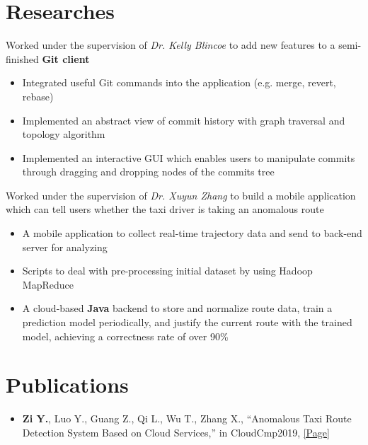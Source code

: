 \documentclass{resume}
\begin{document}
\section{Researches}
\begin{flushleft}
Worked under the supervision of \textit{Dr. Kelly Blincoe} to add new features to a semi-finished \textbf{Git client}
\begin{itemize}
    \item Integrated useful Git commands into the application (e.g. merge, revert, rebase)
    \item Implemented an abstract view of commit history with graph traversal and topology algorithm
    \item Implemented an interactive GUI which enables users to manipulate commits through dragging and \linebreak dropping nodes of the commits tree
\end{itemize}
Worked under the supervision of \textit{Dr. Xuyun Zhang} to build a mobile application which can tell users whether \linebreak the taxi driver is taking an anomalous route
\begin{itemize}
    \item A mobile application to collect real-time trajectory data and send to back-end server for analyzing
    \item Scripts to deal with pre-processing initial dataset by using Hadoop MapReduce
    \item A cloud-based \textbf{Java} backend to store and normalize route data, train a prediction model periodically, \linebreak and justify the current route with the trained model, achieving a correctness rate of over 90\%
\end{itemize}
\end{flushleft}

\section{Publications}
\begin{itemize}
    \item \textbf{Zi Y.}, Luo Y., Guang Z., Qi L., Wu T., Zhang X.,  ``Anomalous Taxi Route Detection System Based on Cloud Services,'' in CloudCmp2019, \href{https://doi.org/10.1007/978-3-030-48513-9_20}{[Page]}
\end{itemize}
\end{document}
